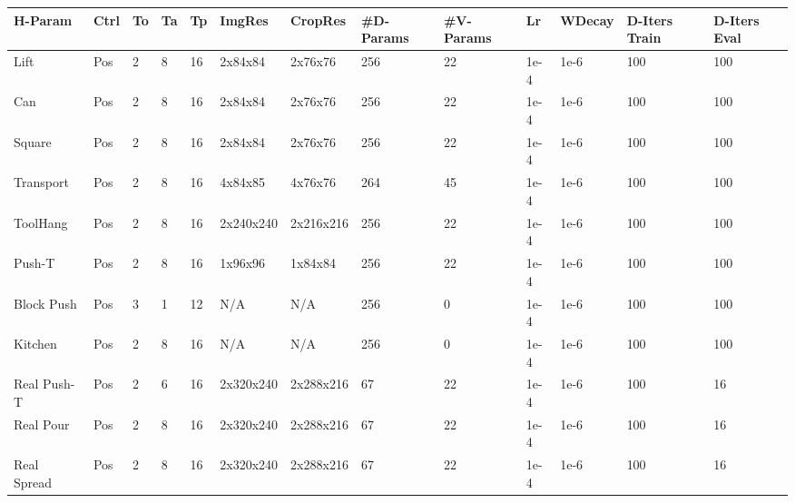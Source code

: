 \documentclass[Afour,sageh,times]{sagej}
\begin{document}
\begin{table}
\centering
\setlength\tabcolsep{3 pt}
\small
\begin{tabular}{l|llllllllllll}
\toprule
\textbf{H-Param} & \textbf{Ctrl} & \textbf{To} & \textbf{Ta} & \textbf{Tp} & \textbf{ImgRes} & \textbf{CropRes} & \textbf{\#D-Params} & \textbf{\#V-Params} & \textbf{Lr} & \textbf{WDecay} & \textbf{D-Iters Train} & \textbf{D-Iters Eval} \\

\midrule
Lift       & Pos  & 2  & 8  & 16 & 2x84x84   & 2x76x76   & 256      & 22       & 1e-4 & 1e-6   & 100           & 100          \\
Can        & Pos  & 2  & 8  & 16 & 2x84x84   & 2x76x76   & 256      & 22       & 1e-4 & 1e-6   & 100           & 100          \\
Square     & Pos  & 2  & 8  & 16 & 2x84x84   & 2x76x76   & 256      & 22       & 1e-4 & 1e-6   & 100           & 100          \\
Transport  & Pos  & 2  & 8  & 16 & 4x84x85   & 4x76x76   & 264      & 45       & 1e-4 & 1e-6   & 100           & 100          \\
ToolHang   & Pos  & 2  & 8  & 16 & 2x240x240 & 2x216x216 & 256      & 22       & 1e-4 & 1e-6   & 100           & 100          \\
Push-T     & Pos  & 2  & 8  & 16 & 1x96x96   & 1x84x84   & 256      & 22       & 1e-4 & 1e-6   & 100           & 100          \\
Block Push & Pos  & 3  & 1  & 12 & N/A       & N/A       & 256      & 0        & 1e-4 & 1e-6   & 100           & 100          \\
Kitchen    & Pos  & 2  & 8  & 16 & N/A       & N/A       & 256      & 0        & 1e-4 & 1e-6   & 100           & 100          \\
\midrule
Real Push-T     & Pos  & 2  & 6  & 16 & 2x320x240 & 2x288x216 & 67       & 22       & 1e-4 & 1e-6   & 100           & 16           \\
Real Pour       & Pos  & 2  & 8  & 16 & 2x320x240 & 2x288x216 & 67       & 22       & 1e-4 & 1e-6   & 100           & 16           \\
Real Spread     & Pos  & 2  & 8  & 16 & 2x320x240 & 2x288x216 & 67       & 22       & 1e-4 & 1e-6   & 100           & 16           \\

\end{tabular}
\end{table}
\end{document}

